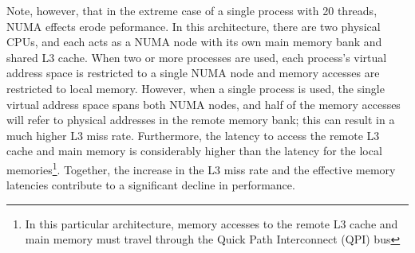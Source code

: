 \documentclass{mc2015}
\begin{document}
Note, however, that in the extreme case of a single process with 20 threads,
NUMA effects erode peformance. In this architecture, there are two physical
CPUs, and each acts as a NUMA node with its own main memory bank and shared L3
cache. When two or more processes are used, each process's virtual address space
is restricted to a single NUMA node and memory accesses are restricted to local
memory.  However, when a single process is used, the single virtual address
space spans both NUMA nodes, and half of the memory accesses will refer to
physical addresses in the remote memory bank; this can result in a much higher
L3 miss rate. Furthermore, the latency to access the remote L3 cache and main
memory is considerably higher than the latency for the local
memories\footnote{In this particular architecture, memory accesses to the remote
  L3 cache and main memory must travel through the Quick Path Interconnect (QPI)
  bus}. Together, the increase in the L3 miss rate and the effective memory
latencies contribute to a significant decline in performance.
\end{document}
